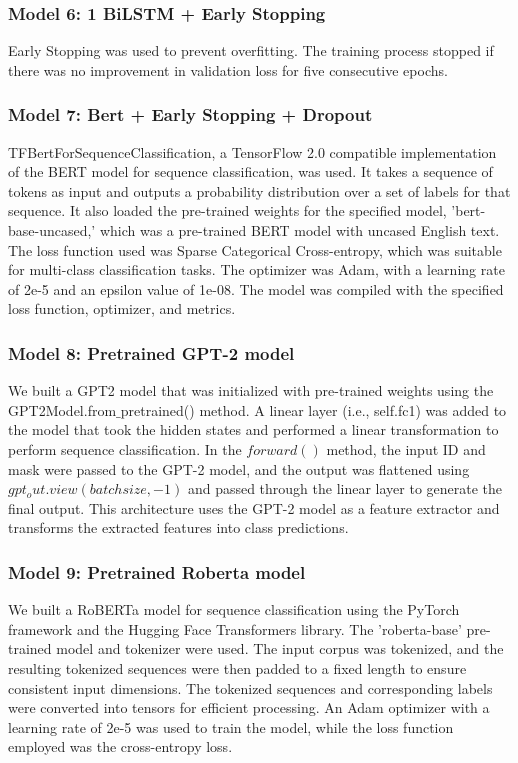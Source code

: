 \documentclass[12pt]{article}
\begin{document}
\subsubsection{Model 6: 1 BiLSTM + Early Stopping}
 Early Stopping was used to prevent overfitting. The training process stopped if there was no improvement in validation loss for five consecutive epochs.
 
 
 
\subsubsection{Model 7: Bert + Early Stopping + Dropout}
 TFBertForSequenceClassification, a TensorFlow 2.0 compatible implementation of the BERT model for sequence classification, was used. It takes a sequence of tokens as input and outputs a probability distribution over a set of labels for that sequence. It also loaded the pre-trained weights for the specified model, 'bert-base-uncased,' which was a pre-trained BERT model with uncased English text. The loss function used was Sparse Categorical Cross-entropy, which was suitable for multi-class classification tasks. The optimizer was Adam, with a learning rate of 2e-5 and an epsilon value of 1e-08. The model was compiled with the specified loss function, optimizer, and metrics.

\subsubsection{Model 8: Pretrained GPT-2 model}
We built a GPT2 model that was initialized with pre-trained weights using the GPT2Model.from$\_$pretrained() method. A linear layer (i.e., self.fc1) was added to the model that took the hidden states and performed a linear transformation to perform sequence classification. In the $forward()$ method, the input ID and mask were passed to the GPT-2 model, and the output was flattened using $gpt_out.view(batch size,-1)$ and passed through the linear layer to generate the final output. This architecture uses the GPT-2 model as a feature extractor and transforms the extracted features into class predictions.

\subsubsection{Model 9: Pretrained Roberta model}
We built a RoBERTa model for sequence classification using the PyTorch framework and the Hugging Face Transformers library. The 'roberta-base' pre-trained model and tokenizer were used. The input corpus was tokenized, and the resulting tokenized sequences were then padded to a fixed length to ensure consistent input dimensions. The tokenized sequences and corresponding labels were converted into tensors for efficient processing. An Adam optimizer with a learning rate of 2e-5 was used to train the model, while the loss function employed was the cross-entropy loss.
\end{document}
